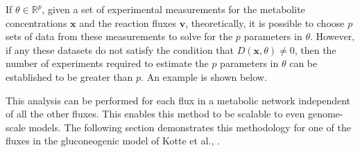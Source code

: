 \documentclass[10pt]{article}
\begin{document}
	If $\theta \in \mathbb{R}^p$, given a set of experimental measurements for the metabolite concentrations $\mathbf{x}$ and the reaction fluxes $\mathbf{v}$, theoretically, it is possible to choose $p$ sets of data from these measurements to solve for the $p$ parameters in $\theta$. However, if any these datasets do not satisfy the condition that $D(\mathbf{x},\theta) \neq 0$, then the number of experiments required to estimate the $p$ parameters in $\theta$ can be established to be greater than $p$. An example is shown below.
	
	This analysis can be performed for each flux in a metabolic network independent of all the other fluxes. This enables this method to be scalable to even genome-scale models. The following section demonstrates this methodology for one of the fluxes in the gluconeogenic model of Kotte et al., \parencite{Kotte2014}.
	
\end{document}
